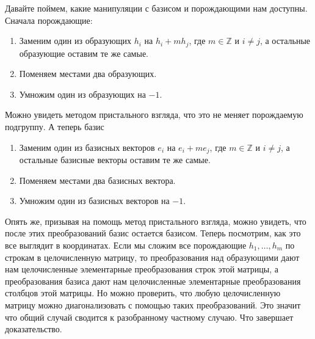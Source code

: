 Давайте поймем, какие манипуляции с базисом и порождающими нам доступны.
Сначала порождающие:
\begin{enumerate}
\item Заменим один из образующих $h_i$ на $h_i + m h_j$, где $m\in \mathbb Z$ и $i\neq j$, а остальные образующие оставим те же самые.

\item Поменяем местами два образующих.

\item Умножим один из образующих на $-1$.
\end{enumerate}
Можно увидеть методом пристального взгляда, что это не меняет порождаемую подгруппу.
А теперь базис
\begin{enumerate}
\item Заменим один из базисных векторов $e_i$ на $e_i + m e_j$, где $m\in \mathbb Z$ и $i\neq j$, а остальные базисные векторы оставим те же самые.

\item Поменяем местами два базисных вектора.

\item Умножим один из базисных векторов на $-1$.
\end{enumerate}
Опять же, призывая на помощь метод пристального взгляда, можно увидеть, что после этих преобразований базис остается базисом.
Теперь посмотрим, как это все выглядит в координатах.
Если мы сложим все порождающие $h_1,\ldots, h_m$ по строкам в целочисленную матрицу, то преобразования над образующими дают нам целочисленные элементарные преобразования строк этой матрицы, а преобразования базиса дают нам целочисленные элементарные преобразования столбцов этой матрицы.
Но можно проверить, что любую целочисленную матрицу можно диагонализовать с помощью таких преобразований.
Это значит что общий случай сводится к разобранному частному случаю.
Что завершает доказательство.